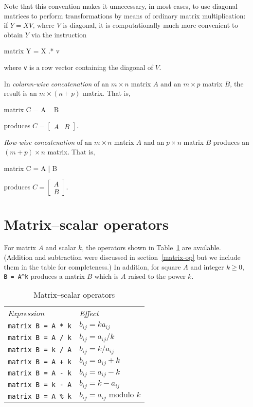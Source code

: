 Note that this convention makes it unnecessary, in most cases, to use
diagonal matrices to perform transformations by means of ordinary
matrix multiplication: if $Y = XV$, where $V$ is diagonal, it is
computationally much more convenient to obtain $Y$ via the instruction
%
\begin{code}
matrix Y = X .* v
\end{code}
%
where \texttt{v} is a row vector containing the diagonal of $V$.

In \textit{column-wise concatenation} of an $m\times n$ matrix $A$ and
an $m\times p$ matrix $B$, the result is an $m\times (n+p)$ matrix.
That is,
%
\begin{code}
matrix C = A ~ B
\end{code}
% 
produces $C = \left[ \begin{array}{cc} A & B \end{array} \right]$.

\textit{Row-wise concatenation} of an $m\times n$ matrix $A$ and
an $p\times n$ matrix $B$ produces an $(m+p) \times n$ matrix.
That is,
%
\begin{code}
matrix C = A | B
\end{code}
% 
produces $C = \left[ \begin{array}{cc} A \\ B \end{array} \right]$.

\section{Matrix--scalar operators}
\label{matrix-scalar-op}

For matrix $A$ and scalar $k$, the operators shown in
Table~\ref{tab:matrix-scalar-ops} are available.  (Addition and
subtraction were discussed in section~\ref{matrix-op} but we include
them in the table for completeness.)  In addition, for square $A$ and
integer $k \geq 0$, \verb|B = A^k| produces a matrix $B$ which is $A$
raised to the power $k$.

\begin{table}[htbp]
\centering
\begin{tabular}{ll}
\textit{Expression} & \textit{Effect} \\[4pt]
\texttt{matrix B = A * k} & $b_{ij} = k a_{ij}$ \\
\texttt{matrix B = A / k} & $b_{ij} = a_{ij} / k$ \\
\texttt{matrix B = k / A} & $b_{ij} = k / a_{ij}$ \\
\texttt{matrix B = A + k} & $b_{ij} = a_{ij} + k$ \\
\texttt{matrix B = A - k} & $b_{ij} = a_{ij} - k$ \\
\texttt{matrix B = k - A} & $b_{ij} = k - a_{ij}$ \\
\texttt{matrix B = A \% k} & $b_{ij} = a_{ij} \mbox{ modulo } k$ \\
\end{tabular}
\caption{Matrix--scalar operators}
\label{tab:matrix-scalar-ops}
\end{table}


